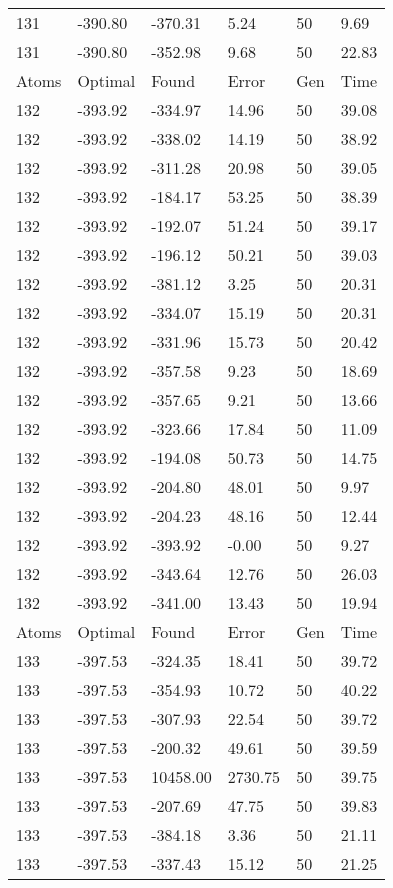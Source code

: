 \documentclass{report}
\begin{document}
\begin{appendix}
\begin{longtable}{llllll}
131 & -390.80 & -370.31 & 5.24 & 50 & 9.69 \\
131 & -390.80 & -352.98 & 9.68 & 50 & 22.83 \\
Atoms & Optimal & Found & Error & Gen & Time \\
132 & -393.92 & -334.97 & 14.96 & 50 & 39.08 \\
132 & -393.92 & -338.02 & 14.19 & 50 & 38.92 \\
132 & -393.92 & -311.28 & 20.98 & 50 & 39.05 \\
132 & -393.92 & -184.17 & 53.25 & 50 & 38.39 \\
132 & -393.92 & -192.07 & 51.24 & 50 & 39.17 \\
132 & -393.92 & -196.12 & 50.21 & 50 & 39.03 \\
132 & -393.92 & -381.12 & 3.25 & 50 & 20.31 \\
132 & -393.92 & -334.07 & 15.19 & 50 & 20.31 \\
132 & -393.92 & -331.96 & 15.73 & 50 & 20.42 \\
132 & -393.92 & -357.58 & 9.23 & 50 & 18.69 \\
132 & -393.92 & -357.65 & 9.21 & 50 & 13.66 \\
132 & -393.92 & -323.66 & 17.84 & 50 & 11.09 \\
132 & -393.92 & -194.08 & 50.73 & 50 & 14.75 \\
132 & -393.92 & -204.80 & 48.01 & 50 & 9.97 \\
132 & -393.92 & -204.23 & 48.16 & 50 & 12.44 \\
132 & -393.92 & -393.92 & -0.00 & 50 & 9.27 \\
132 & -393.92 & -343.64 & 12.76 & 50 & 26.03 \\
132 & -393.92 & -341.00 & 13.43 & 50 & 19.94 \\
Atoms & Optimal & Found & Error & Gen & Time \\
133 & -397.53 & -324.35 & 18.41 & 50 & 39.72 \\
133 & -397.53 & -354.93 & 10.72 & 50 & 40.22 \\
133 & -397.53 & -307.93 & 22.54 & 50 & 39.72 \\
133 & -397.53 & -200.32 & 49.61 & 50 & 39.59 \\
133 & -397.53 & 10458.00 & 2730.75 & 50 & 39.75 \\
133 & -397.53 & -207.69 & 47.75 & 50 & 39.83 \\
133 & -397.53 & -384.18 & 3.36 & 50 & 21.11 \\
133 & -397.53 & -337.43 & 15.12 & 50 & 21.25 \\

\end{longtable}
\end{appendix}
\end{document}
